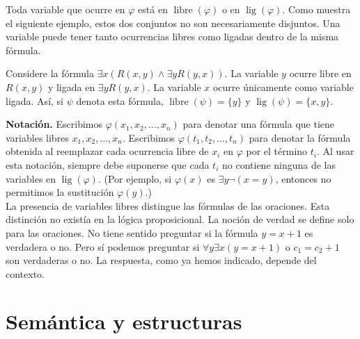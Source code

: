 \documentclass[12pt,a4paper]{book}
\DeclareMathOperator{\libre}{libre}
\DeclareMathOperator{\lig}{lig}
\begin{document}
    Toda variable que ocurre en $\varphi$ está en $\libre(\varphi)$ o en $\lig(\varphi)$. Como muestra el siguiente ejemplo,
    estos dos conjuntos no son necesariamente disjuntos. Una variable puede tener tanto ocurrencias libres como ligadas
    dentro de la misma fórmula.

    \begin{ejemplo}
        Considere la fórmula $\exists x(R(x,y)\wedge\exists yR(y,x))$. La variable $y$ ocurre libre en $R(x,y)$ y ligada en
        $\exists yR(y,x)$. La variable $x$ ocurre únicamente como variable ligada. Así, si $\psi$ denota esta fórmula,
        $\libre(\psi)=\{y\}$ y $\lig(\psi)=\{x,y\}$.
    \end{ejemplo}

    \textbf{Notación.} Escribimos $\varphi(x_{1},x_{2},\dots,x_{n})$ para denotar una fórmula que tiene variables libres
    $x_{1},x_{2},\dots,x_{n}$. Escribimos $\varphi(t_{1},t_{2},\dots,t_{n})$ para denotar la fórmula obtenida al reemplazar
    cada ocurrencia libre de $x_{i}$ en $\varphi$ por el término $t_{i}$. Al usar esta notación, siempre debe suponerse que
    cada $t_{i}$ no contiene ninguna de las variables en $\lig(\varphi)$. (Por ejemplo, si $\varphi(x)$ es
    $\exists y\neg(x=y)$, entonces no permitimos la sustitución $\varphi(y)$.)\\
    La presencia de variables libres distingue las fórmulas de las oraciones. Esta distinción no existía en la lógica
    proposicional. La noción de verdad se define solo para las oraciones. No tiene sentido preguntar si la fórmula
    $y=x+1$ es verdadera o no. Pero sí podemos preguntar si $\forall y\exists x(y=x+1)$ o $c_{1}=c_{2}+1$ son verdaderas o
    no. La respuesta, como ya hemos indicado, depende del contexto.

    \section{Semántica y estructuras}
\end{document}
